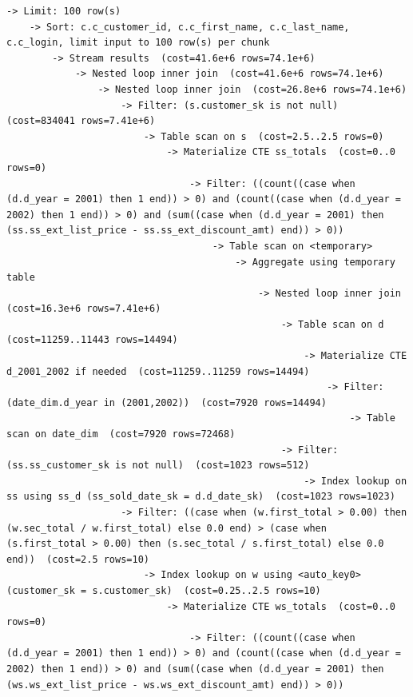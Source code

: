 \documentclass{ULBreport}
\begin{document}
\begin{lstlisting}[caption={Optimized \texttt{EXPLAIN FORMAT=TREE} on SF8 for Query 11}, label={lst:q11_explain_opt}, basicstyle=\ttfamily\scriptsize, breaklines=true, frame=single]
-> Limit: 100 row(s)
    -> Sort: c.c_customer_id, c.c_first_name, c.c_last_name, c.c_login, limit input to 100 row(s) per chunk
        -> Stream results  (cost=41.6e+6 rows=74.1e+6)
            -> Nested loop inner join  (cost=41.6e+6 rows=74.1e+6)
                -> Nested loop inner join  (cost=26.8e+6 rows=74.1e+6)
                    -> Filter: (s.customer_sk is not null)  (cost=834041 rows=7.41e+6)
                        -> Table scan on s  (cost=2.5..2.5 rows=0)
                            -> Materialize CTE ss_totals  (cost=0..0 rows=0)
                                -> Filter: ((count((case when (d.d_year = 2001) then 1 end)) > 0) and (count((case when (d.d_year = 2002) then 1 end)) > 0) and (sum((case when (d.d_year = 2001) then (ss.ss_ext_list_price - ss.ss_ext_discount_amt) end)) > 0))
                                    -> Table scan on <temporary>
                                        -> Aggregate using temporary table
                                            -> Nested loop inner join  (cost=16.3e+6 rows=7.41e+6)
                                                -> Table scan on d  (cost=11259..11443 rows=14494)
                                                    -> Materialize CTE d_2001_2002 if needed  (cost=11259..11259 rows=14494)
                                                        -> Filter: (date_dim.d_year in (2001,2002))  (cost=7920 rows=14494)
                                                            -> Table scan on date_dim  (cost=7920 rows=72468)
                                                -> Filter: (ss.ss_customer_sk is not null)  (cost=1023 rows=512)
                                                    -> Index lookup on ss using ss_d (ss_sold_date_sk = d.d_date_sk)  (cost=1023 rows=1023)
                    -> Filter: ((case when (w.first_total > 0.00) then (w.sec_total / w.first_total) else 0.0 end) > (case when (s.first_total > 0.00) then (s.sec_total / s.first_total) else 0.0 end))  (cost=2.5 rows=10)
                        -> Index lookup on w using <auto_key0> (customer_sk = s.customer_sk)  (cost=0.25..2.5 rows=10)
                            -> Materialize CTE ws_totals  (cost=0..0 rows=0)
                                -> Filter: ((count((case when (d.d_year = 2001) then 1 end)) > 0) and (count((case when (d.d_year = 2002) then 1 end)) > 0) and (sum((case when (d.d_year = 2001) then (ws.ws_ext_list_price - ws.ws_ext_discount_amt) end)) > 0))

\end{lstlisting}
\end{document}
